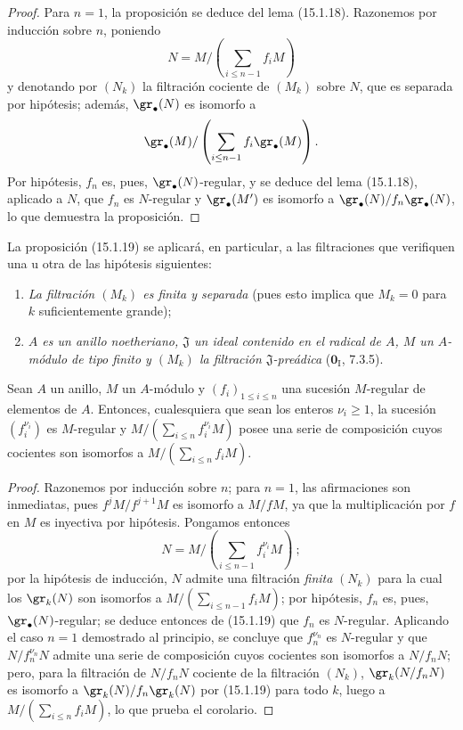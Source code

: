 \begin{proof}
Para $n=1$, la proposición se deduce del lema (15.1.18). Razonemos por
inducción sobre $n$, poniendo
\[
  N=M/\left(\sum_{i\leq n-1}f_iM\right)
\]
y denotando por $(N_k)$ la filtración cociente de $(M_k)$ sobre $N$, que es
separada por hipótesis; además, $\gr_\bullet(N)$ es isomorfo a
\[
  \gr_\bullet(M)/
  \left(\sum_{i\leq n-1}f_i\gr_\bullet(M)\right).
\]
Por hipótesis, $f_n$ es, pues, $\gr_\bullet(N)$-regular, y se deduce del lema
(15.1.18), aplicado a $N$, que $f_n$ es $N$-regular y $\gr_\bullet(M')$ es
isomorfo a $\gr_\bullet(N)/f_n\gr_\bullet(N)$, lo que demuestra la
proposición.
\end{proof}

La proposición (15.1.19) se aplicará, en particular, a las filtraciones que
verifiquen una u otra de las hipótesis siguientes:
\begin{enumerate}
  \item[$1^\circ$] \emph{La filtración $(M_k)$ es finita y separada} (pues esto
  implica que $M_k=0$ para $k$ suficientemente grande);
  \item[$2^\circ$] \emph{$A$ es un anillo noetheriano, $\mathfrak{J}$ un ideal
  contenido en el radical de $A$, $M$ un $A$-módulo de tipo finito y $(M_k)$
  la filtración $\mathfrak{J}$-preádica} ($\mathbf{0}_{\mathrm I}$, 7.3.5).
\end{enumerate}

\begin{corollary}[15.1.20]
\label{0.15.1.20-es}
Sean $A$ un anillo, $M$ un $A$-módulo y $(f_i)_{1\leq i\leq n}$ una sucesión
$M$-regular de elementos de $A$. Entonces, cualesquiera que sean los enteros
$\nu_i\geq1$, la sucesión $(f_i^{\nu_i})$ es $M$-regular y
$M/(\sum_{i\leq n}f_i^{\nu_i}M)$ posee una serie de composición cuyos
cocientes son isomorfos a $M/(\sum_{i\leq n}f_iM)$.
\end{corollary}

\begin{proof}
Razonemos por inducción sobre $n$; para $n=1$, las afirmaciones son inmediatas,
pues $f^jM/f^{j+1}M$ es isomorfo a $M/fM$, ya que la multiplicación por $f$ en
$M$ es inyectiva por hipótesis. Pongamos entonces
\[
  N=M/\left(\sum_{i\leq n-1}f_i^{\nu_i}M\right)~;
\]
por la hipótesis de inducción, $N$ admite una filtración \emph{finita} $(N_k)$ para la
cual los $\gr_k(N)$ son isomorfos a
$M/(\sum_{i\leq n-1}f_iM)$; por hipótesis, $f_n$ es, pues,
$\gr_\bullet(N)$-regular; se deduce entonces de (15.1.19) que $f_n$ es
$N$-regular. Aplicando el caso $n=1$ demostrado al principio, se concluye que
$f_n^{\nu_n}$ es $N$-regular y que $N/f_n^{\nu_n}N$ admite una serie de
composición cuyos cocientes son isomorfos a $N/f_nN$; pero, para la filtración
de $N/f_nN$ cociente de la filtración $(N_k)$,
$\gr_k(N/f_nN)$ es isomorfo a $\gr_k(N)/f_n\gr_k(N)$ por (15.1.19) para todo
$k$, luego a $M/(\sum_{i\leq n}f_iM)$, lo que prueba el corolario.
\end{proof}

